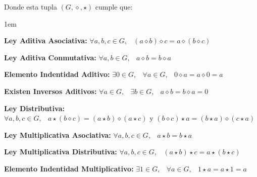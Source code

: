 \documentclass[12pt, fleqn]{report}                             %
\newenvironment{Indentation}[1][0.75em]                         %
        {\begin{adjustwidth}{#1}{}}                                 %
        {\end{adjustwidth}}                                         %
\DeclareMathOperator \Space     {\quad}                         %
\DeclareMathOperator \MiniSpace {\;}                            %
\theoremstyle{break}                                            %
\begin{document}
                Donde esta tupla $(G, \diamond, \star)$ cumple que:
                \begin{Indentation}[1em]
                \begin{itemize}
                \small{
                    
                    \item 
                        \textbf{Ley Aditiva Asociativa:}
                        $\forall a, b, c \in G, \MiniSpace
                            (a \diamond b) \diamond c = a \diamond (b \diamond c)$

                    \item 
                        \textbf{Ley Aditiva Conmutativa:}
                        $\forall a, b \in G, \MiniSpace a \diamond b = b \diamond a$


                    \item 
                        \textbf{Elemento Indentidad Aditivo:}
                        $\exists 0 \in G, \MiniSpace
                            \forall a \in G, \MiniSpace 0 \diamond a = a \diamond 0 = a$

                    \item 
                        \textbf{Existen Inversos Aditivos:}
                        $\forall a \in G, \MiniSpace
                                \exists b \in G, \MiniSpace
                                    a \diamond b = b \diamond a = 0$


                    \item 
                        \textbf{Ley Distributiva:}
                        $\forall a, b, c \in G, \MiniSpace
                            a \star (b \diamond c) = (a \star b) \diamond (a \star c) 
                            \text{ y }
                            (b \diamond c)\star a = (b\star a) \diamond (c \star a)$

                    \item 
                        \textbf{Ley Multiplicativa Asociativa:}
                        $\forall a, b, c \in G, \MiniSpace
                            a \star b = b \star a$

                    \item 
                        \textbf{Ley Multiplicativa Distributiva:}
                        $\forall a, b, c \in G, \MiniSpace
                            (a \star b) \star c = a \star (b \star c)$

                    \item 
                        \textbf{Elemento Indentidad Multiplicativo:}
                        $\exists 1 \in G, \MiniSpace
                            \forall a \in G, \MiniSpace 1 \star a = a \star 1 = a$

}
\end{itemize}
\end{Indentation}
\end{document}
